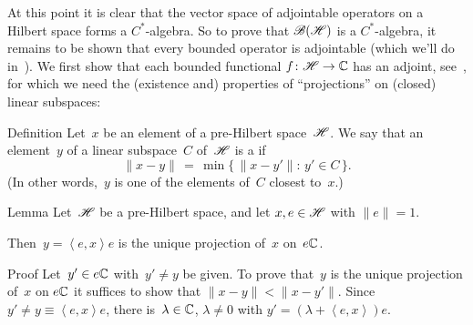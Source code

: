 \documentclass[main]{subfiles}
\begin{document}
\begin{parsec}%
\begin{point}%
At this point
it is clear that the vector space of adjointable operators
on a Hilbert space forms a $C^*$-algebra.
So to prove that $\mathscr{B}(\mathscr{H})$
is a $C^*$-algebra,
it remains to be shown that every bounded operator
is adjointable (which we'll do in~).
We first show that each bounded functional $f\colon \mathscr{H}\to \mathbb{C}$
has an adjoint, see~,
for which we need the (existence and) properties of ``projections''
on (closed) linear subspaces:
\end{point}
\begin{point}{Definition}
Let~$x$ be an element of a pre-Hilbert space~$\mathscr{H}$.
We say that an element~$y$ of a linear subspace~$C$
of~$\mathscr{H}$ is a 
if
\begin{equation*}
\|x-y\|\,=\,\min\{\,\|x-y'\|\colon \,y'\in C\,\}.
\end{equation*}
(In other words,~$y$ is one of the elements of~$C$ closest to~$x$.)
\end{point}
\begin{point}{Lemma}%
Let~$\mathscr{H}$ be a pre-Hilbert space,
and let $x,e\in\mathscr{H}$ with
$\|e\|=1$.

Then~$y=\left<e,x\right>e$ is the unique projection of~$x$ on~$e\mathbb{C}$.
\begin{point}{Proof}%
Let~$y'\in e\mathbb{C}$
with~$y'\neq y$
be given.
To prove that~$y$
is the unique projection of~$x$ on $e\mathbb{C}$
it suffices to show that $\|x-y\|<\|x-y'\|$.
Since~$y'\neq y\equiv \left<e,x\right>e$,
there is~$\lambda\in \mathbb{C}$, $\lambda\neq 0$ 
with $y'=(\lambda+\left<e,x\right>)e$.


\end{point}
\end{point}
\end{parsec}
\end{document}
